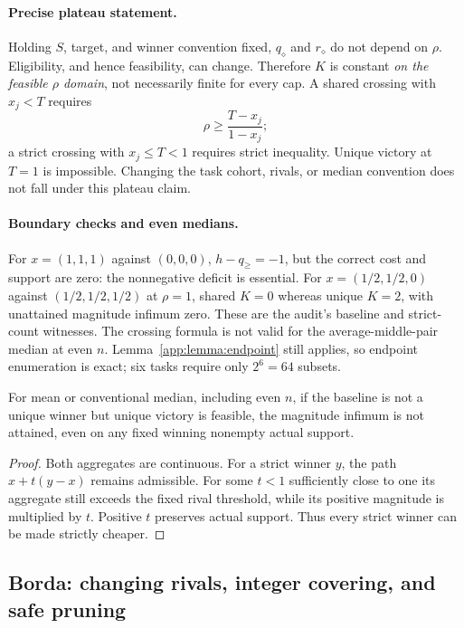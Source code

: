 \paragraph{Precise plateau statement.}
Holding $S$, target, and winner convention fixed, $q_\diamond$ and $r_\diamond$ do not depend on $\rho$. Eligibility, and hence feasibility, can change. Therefore $K$ is constant \emph{on the feasible $\rho$ domain}, not necessarily finite for every cap. A shared crossing with $x_j<T$ requires
\[
 \rho\geq\frac{T-x_j}{1-x_j};
\]
a strict crossing with $x_j\leq T<1$ requires strict inequality. Unique victory at $T=1$ is impossible. Changing the task cohort, rivals, or median convention does not fall under this plateau claim.

\paragraph{Boundary checks and even medians.}
For $x=(1,1,1)$ against $(0,0,0)$, $h-q_{\geq}=-1$, but the correct cost and support are zero: the nonnegative deficit is essential. For $x=(1/2,1/2,0)$ against $(1/2,1/2,1/2)$ at $\rho=1$, shared $K=0$ whereas unique $K=2$, with unattained magnitude infimum zero. These are the audit's baseline and strict-count witnesses. The crossing formula is not valid for the average-middle-pair median at even $n$. Lemma~\ref{app:lemma:endpoint} still applies, so endpoint enumeration is exact; six tasks require only $2^6=64$ subsets.

\begin{applemma}
\label{app:lemma:nonattainment}
For mean or conventional median, including even $n$, if the baseline is not a unique winner but unique victory is feasible, the magnitude infimum is not attained, even on any fixed winning nonempty actual support.
\end{applemma}
\begin{proof}
Both aggregates are continuous. For a strict winner $y$, the path $x+t(y-x)$ remains admissible. For some $t<1$ sufficiently close to one its aggregate still exceeds the fixed rival threshold, while its positive magnitude is multiplied by $t$. Positive $t$ preserves actual support. Thus every strict winner can be made strictly cheaper.
\end{proof}

\subsection{Borda: changing rivals, integer covering, and safe pruning}
\label{app:borda}

